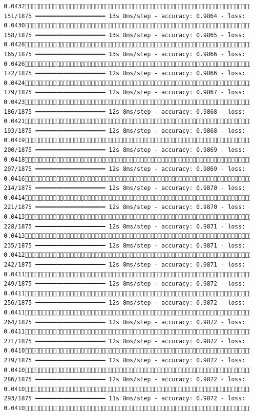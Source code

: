 \documentclass[
  letterpaper,
  DIV=11,
  numbers=noendperiod]{scrreprt}
\begin{document}
\begin{verbatim}
0.0432 151/1875 ━━━━━━━━━━━━━━━━━━━━ 13s 8ms/step - accuracy: 0.9864 - loss: 0.0430 158/1875 ━━━━━━━━━━━━━━━━━━━━ 13s 8ms/step - accuracy: 0.9865 - loss: 0.0428 165/1875 ━━━━━━━━━━━━━━━━━━━━ 13s 8ms/step - accuracy: 0.9866 - loss: 0.0426 172/1875 ━━━━━━━━━━━━━━━━━━━━ 12s 8ms/step - accuracy: 0.9866 - loss: 0.0424 179/1875 ━━━━━━━━━━━━━━━━━━━━ 12s 8ms/step - accuracy: 0.9867 - loss: 0.0423 186/1875 ━━━━━━━━━━━━━━━━━━━━ 12s 8ms/step - accuracy: 0.9868 - loss: 0.0421 193/1875 ━━━━━━━━━━━━━━━━━━━━ 12s 8ms/step - accuracy: 0.9868 - loss: 0.0419 200/1875 ━━━━━━━━━━━━━━━━━━━━ 12s 8ms/step - accuracy: 0.9869 - loss: 0.0418 207/1875 ━━━━━━━━━━━━━━━━━━━━ 12s 8ms/step - accuracy: 0.9869 - loss: 0.0416 214/1875 ━━━━━━━━━━━━━━━━━━━━ 12s 8ms/step - accuracy: 0.9870 - loss: 0.0414 221/1875 ━━━━━━━━━━━━━━━━━━━━ 12s 8ms/step - accuracy: 0.9870 - loss: 0.0413 228/1875 ━━━━━━━━━━━━━━━━━━━━ 12s 8ms/step - accuracy: 0.9871 - loss: 0.0413 235/1875 ━━━━━━━━━━━━━━━━━━━━ 12s 8ms/step - accuracy: 0.9871 - loss: 0.0412 242/1875 ━━━━━━━━━━━━━━━━━━━━ 12s 8ms/step - accuracy: 0.9871 - loss: 0.0411 249/1875 ━━━━━━━━━━━━━━━━━━━━ 12s 8ms/step - accuracy: 0.9872 - loss: 0.0411 256/1875 ━━━━━━━━━━━━━━━━━━━━ 12s 8ms/step - accuracy: 0.9872 - loss: 0.0411 264/1875 ━━━━━━━━━━━━━━━━━━━━ 12s 8ms/step - accuracy: 0.9872 - loss: 0.0411 271/1875 ━━━━━━━━━━━━━━━━━━━━ 12s 8ms/step - accuracy: 0.9872 - loss: 0.0410 279/1875 ━━━━━━━━━━━━━━━━━━━━ 12s 8ms/step - accuracy: 0.9872 - loss: 0.0410 286/1875 ━━━━━━━━━━━━━━━━━━━━ 12s 8ms/step - accuracy: 0.9872 - loss: 0.0410 293/1875 ━━━━━━━━━━━━━━━━━━━━ 11s 8ms/step - accuracy: 0.9872 - loss: 0.0410 
\end{verbatim}
\end{document}
